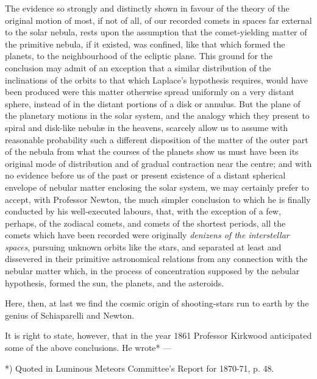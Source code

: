 \documentclass[a4paper, 12pt, oneside, polutonikogreek, english]{article}
\begin{document}
The evidence so strongly and distinctly shown in favour of the theory of the original motion of most, if not of all, of our recorded comets in spaces far external to the solar nebula, rests upon the assumption that the comet-yielding matter of the primitive nebula, if it existed, was confined, like that which formed the planets, to the neighbourhood of the ecliptic plane. This ground for the conclusion may admit of an exception that a similar distribution of the inclinations of the orbits to that which Laplace's hypothesis requires, would have been produced were this matter otherwise spread uniformly on a very distant sphere, instead of in the distant portions of a disk or annulus. But the plane of the planetary motions in the solar system, and the analogy which they present to spiral and disk-like nebulæ in the heavens, scarcely allow us to assume with reasonable probability such a different disposition of the matter of the outer part of the nebula from what the courses of the planets show us must have been its original mode of distribution and of gradual contraction near the centre; and with no evidence before us of the past or present existence of a distant spherical envelope of nebular matter enclosing the solar system, we may certainly prefer to accept, with Professor Newton, the much simpler conclusion to which he is finally conducted by his well-executed labours, that, with the exception of a few, perhaps, of the zodiacal comets, and comets of the shortest periods, all the comets which have been recorded were originally \emph{denizens of the interstellar spaces}, pursuing unknown orbits like the stars, and separated at least and dissevered in their primitive astronomical relations from any connection with the nebular matter which, in the process of concentration supposed by the nebular hypothesis, formed the sun, the planets, and the asteroids.

Here, then, at last we find the cosmic origin of shooting-stars run to earth by the genius of Schiaparelli and Newton.

It is right to state, however, that in the year 1861 Professor Kirkwood anticipated some of the above conclusions. He wrote* ---

*) Quoted in Luminous Meteors Committee's Report for 1870-71, p. 48.
\end{document}
